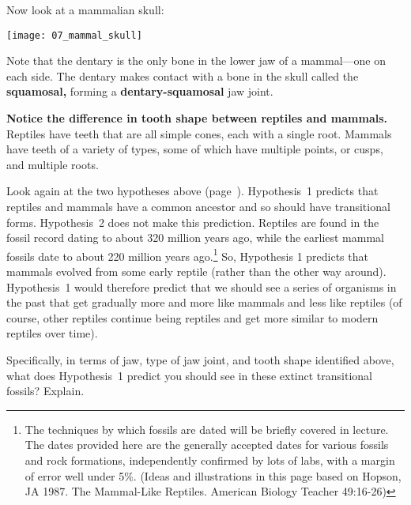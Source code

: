 \documentclass[12pt, hidelinks]{exam}
\begin{document}
\begin{questions}
Now look at a mammalian skull:

	\begin{center}\texttt{[image: 07\_mammal\_skull]} \end{center}
	
Note that the dentary is the only bone in the lower jaw of a mammal—one on each side.  The dentary makes contact with a bone in the skull called the \textbf{squamosal,} forming a \textbf{dentary-squamosal} jaw joint. 

\textbf{Notice the difference in tooth shape between reptiles and mammals.} Reptiles have teeth that are all simple cones, each with a single root.  Mammals have teeth of a variety of types, some of which have multiple points, or cusps, and multiple roots.

%


Look again at the two hypotheses above (page~\pageref{hypothesis1}). Hypothesis~1 predicts that reptiles and mammals have a common ancestor and so should have transitional forms. Hypothesis~2 does not make this prediction. Reptiles are found in the fossil record dating to about 320 million years ago, while the earliest mammal fossils date to about 220 million years ago.\footnote{The techniques by which fossils are dated will be briefly covered in lecture. The dates provided here are the generally accepted dates for various fossils and rock formations, independently confirmed by lots of labs, with a margin of error well under 5\%.  (Ideas and illustrations in this page based on Hopson, JA 1987.  The Mammal-Like Reptiles.  American Biology Teacher 49:16-26)}  So, Hypothesis 1 predicts that mammals evolved from some early reptile (rather than the other way around). Hypothesis~1 would therefore predict that we should see a series of organisms in the past that get gradually more and more like mammals and less like reptiles (of course, other reptiles continue being reptiles and get more similar to modern reptiles over time).  

\question
Specifically, in terms of jaw, type of jaw joint, and tooth shape identified above, what does Hypothesis~1 predict you should see in these extinct transitional fossils?  Explain.


\end{questions}
\end{document}
